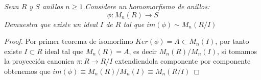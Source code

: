 \documentclass[11pt,letterpaper]{article}
\begin{document}
\begin{tcolorbox}[
	title = \textcolor{black}{\textcolor{white}{Problema 7}},]
\textit{Sean $R$ y $S$ anillos $n\geq 1$.Considere un homomorfismo de anillos:\,\\
\begin{equation*}
    \phi:M_n(R)\to S
\end{equation*}
Demuestra que existe un ideal $I$ de $R$ tal que $im(\phi)\sim M_n(R/ I)$}
\end{tcolorbox}
\begin{proof}
   Por primer teorema de isomorfimo $Ker(\phi)=A\subset M_n(I)$, por tanto existe $I\subset R$ ideal tal que $M_n(R)=A$, es decir $M_n(R)/ M_n(I)$, si tomamos la proyecci\'on canonica $\pi:R\to R/ I$ extendiendola componente por
   componente obtenemos que $im(\phi)\equiv M_n(R)/ M_n(I)\equiv M_n(R/ I)$
\end{proof}
\end{document}
